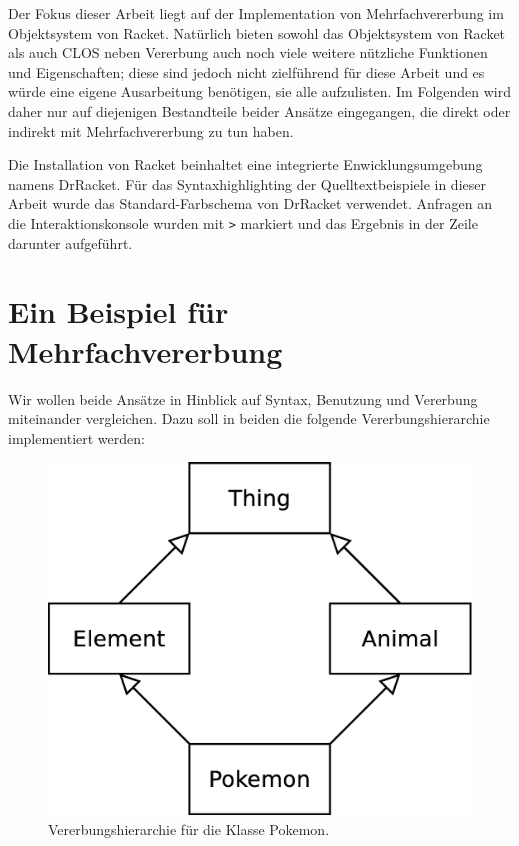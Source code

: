 Der Fokus dieser Arbeit liegt auf der Implementation von Mehrfachvererbung im Objektsystem von Racket. Natürlich bieten sowohl das Objektsystem von Racket als auch CLOS neben Vererbung auch noch viele weitere nützliche Funktionen und Eigenschaften; diese sind jedoch nicht zielführend für diese Arbeit und es würde eine eigene Ausarbeitung benötigen, sie alle aufzulisten. Im Folgenden wird daher nur auf diejenigen Bestandteile beider Ansätze eingegangen, die direkt oder indirekt mit Mehrfachvererbung zu tun haben. 

Die Installation von Racket beinhaltet eine integrierte Enwicklungsumgebung namens DrRacket. Für das Syntaxhighlighting der Quelltextbeispiele in dieser Arbeit wurde das Standard-Farbschema von DrRacket verwendet. Anfragen an die Interaktionskonsole wurden mit \texttt{>} markiert und das Ergebnis in der Zeile darunter aufgeführt. 

\section{Ein Beispiel für Mehrfachvererbung} 

Wir wollen beide Ansätze in Hinblick auf Syntax, Benutzung und Vererbung miteinander vergleichen. Dazu soll in beiden die folgende Vererbungshierarchie implementiert werden:

\begin{figure}[h]
 \centering
 \includegraphics[scale=0.3]{pictures/pokemon}
 \caption{Vererbungshierarchie für die Klasse Pokemon.}
 \label{pokemon}
\end{figure}

